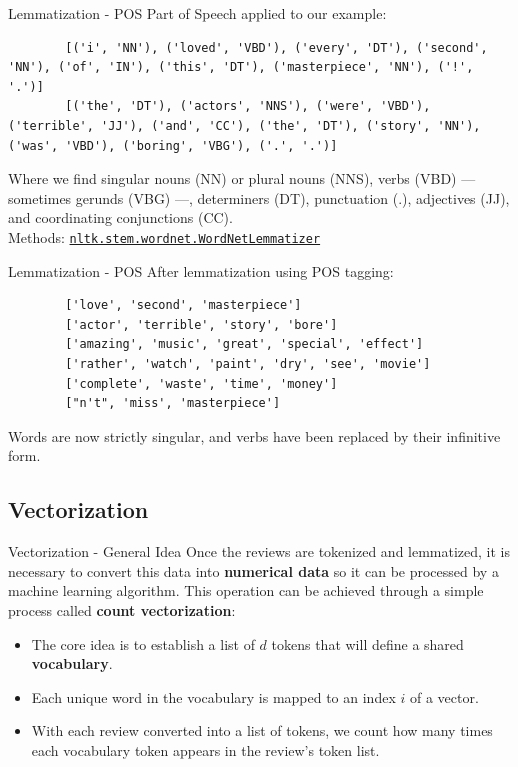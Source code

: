 \begin{frame}[fragile]{Lemmatization - POS}
	Part of Speech applied to our example:
	\begin{lstlisting}
		[('i', 'NN'), ('loved', 'VBD'), ('every', 'DT'), ('second', 'NN'), ('of', 'IN'), ('this', 'DT'), ('masterpiece', 'NN'), ('!', '.')]
		[('the', 'DT'), ('actors', 'NNS'), ('were', 'VBD'), ('terrible', 'JJ'), ('and', 'CC'), ('the', 'DT'), ('story', 'NN'), ('was', 'VBD'), ('boring', 'VBG'), ('.', '.')]
	\end{lstlisting}
	Where we find singular nouns (NN) or plural nouns (NNS), verbs (VBD) — sometimes gerunds (VBG) —, determiners (DT), punctuation (.), adjectives (JJ), and coordinating conjunctions (CC). \\
	\vfill
	Methods: \href{https://www.nltk.org/api/nltk.stem.wordnet.html#nltk.stem.wordnet.WordNetLemmatizer}{\texttt{nltk.stem.wordnet.WordNetLemmatizer}}
\end{frame}

\begin{frame}[fragile]{Lemmatization - POS}
	After lemmatization using POS tagging:
	\begin{lstlisting}
		['love', 'second', 'masterpiece']
		['actor', 'terrible', 'story', 'bore']
		['amazing', 'music', 'great', 'special', 'effect']
		['rather', 'watch', 'paint', 'dry', 'see', 'movie']
		['complete', 'waste', 'time', 'money']
		["n't", 'miss', 'masterpiece']
	\end{lstlisting}
	Words are now strictly singular, and verbs have been replaced by their infinitive form.
\end{frame}

\subsection[Vectorization]{Vectorization}

\begin{frame}{Vectorization - General Idea}
	Once the reviews are tokenized and lemmatized, it is necessary to convert this data into \textbf{numerical data} so it can be processed by a machine learning algorithm. This operation can be achieved through a simple process called \textbf{count vectorization}:
	\begin{itemize}
		\item The core idea is to establish a list of $d$ tokens that will define a shared \textbf{vocabulary}.
		\item Each unique word in the vocabulary is mapped to an index $i$ of a vector.
		\item With each review converted into a list of tokens, we count how many times each vocabulary token appears in the review's token list.
	\end{itemize}	
\end{frame}

